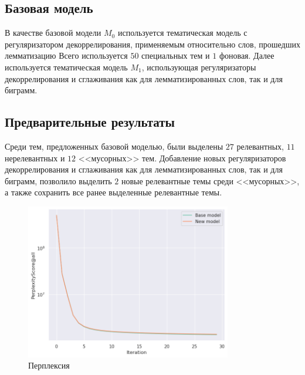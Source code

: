 \documentclass{article}
\begin{document}

\subsection{Базовая модель}


В качестве базовой модели $M_0$ используется тематическая модель с регуляризатором декоррелирования, применяемым относительно слов, прошедших лемматизацию
Всего используется $50$ специальных тем и $1$ фоновая.
Далее используется тематическая модель $M_1$, использующая регуляризаторы декоррелирования и сглаживания как для лемматизированных слов, так и для биграмм.

\subsection{Предварительные результаты}

Среди тем, предложенных базовой моделью, были выделены $27$ релевантных, $11$ нерелевантных и $12$ <<мусорных>> тем.
Добавление новых регуляризаторов декоррелирования и сглаживания как для лемматизированных слов, так и для биграмм, позволило выделить $2$ новые релевантные темы среди <<мусорных>>, а также сохранить все ранее выделенные релевантные темы.

\begin{figure}[h]
\includegraphics[width=9cm]{figures/perplexity_all.png}
\centering
\caption{Перплексия}
\end{figure}
\end{document}
